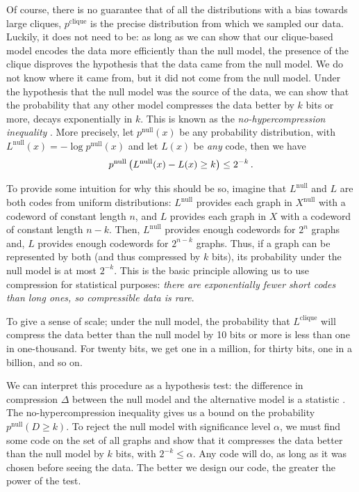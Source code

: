 \documentclass[twoside,11pt]{article}
\newcommand{\p}{\mbox{\,.}}
\begin{document}
Of course, there is no guarantee that of all the distributions with a bias towards large cliques, $p^\text{clique}$ is the precise distribution from which we sampled our data. Luckily, it does not need to be: as long as we can show that our clique-based model encodes the data more efficiently than the null model, the presence of the clique disproves the hypothesis that the data came from the null model. We do not know where it came from, but it did not come from the null model. Under the hypothesis that the null model was the source of the data, we can show that the probability that any other model compresses the data better by $k$ bits or more, decays exponentially in $k$. This is known as  the \emph{no-hypercompression inequality} \cite[p103]{grunwald2007minimum}. More precisely, let $p^\text{null}(x)$ be any probability distribution, with $L^\text{null}(x) = - \log p^\text{null}(x)$ and let $L(x)$ be \emph{any} code, then we have
\[
p^\text{null}\left(L^\text{null}(x) - L(x) \geq k\right) \leq 2^{-k} \p
\]

To provide some intuition for why this should be so, imagine that $L^\text{null}$ and $L$ are both codes from uniform distributions: $L^\text{null}$ provides each graph in $X^\text{null}$ with a codeword of constant length $n$, and $L$ provides each graph in $X$ with a codeword of constant length $n-k$. Then, $L^\text{null}$ provides enough codewords for $2^n$ graphs and, $L$ provides enough codewords for $2^{n-k}$ graphs. Thus, if a graph can be represented by both (and thus compressed by $k$ bits), its probability under the null model is at most $2^{-k}$. This is the basic principle allowing us to use compression for statistical purposes: \emph{there are exponentially fewer short codes than long ones, so compressible data is rare}.

To give a sense of scale; under the null model, the probability that $L^\text{clique}$ will compress the data better than the null model by 10 bits or more is less than one in one-thousand. For twenty bits, we get one in a million, for thirty bits, one in a billion, and so on. 

We can interpret this procedure as a hypothesis test: the difference in compression $\Delta$ between the null model and the alternative model is a statistic \cite[Example~14.2]{grunwald2007minimum}. The no-hypercompression inequality gives us a bound on the probability $p^\text{null}(D \geq k)$. To reject the null model with significance level $\alpha$, we must find some code on the set of all graphs and show that it compresses the data better than the null model by $k$ bits, with $2^{-k} \leq \alpha$. Any code will do, as long as it was chosen before seeing the data. The better we design our code, the greater the power of the test.
\end{document}
